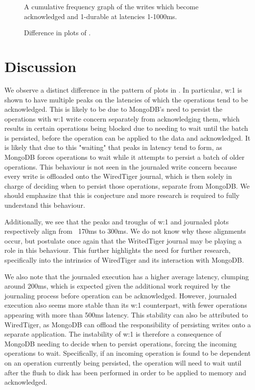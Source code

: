 \begin{figure}
    \centering        
    
    \label{fig:cdf}
    \caption{A cumulative frequency graph of the writes which become acknowledged and 1-durable at latencies 1-1000ms.}
\end{figure}

\begin{figure}
    \centering
    
    \label{fig:diff}
    \caption{Difference in plots of .}
\end{figure}

\section{Discussion}

We observe a distinct difference in the pattern of plots in . In particular, w:1 is shown to have multiple peaks on the latencies of which the operations tend to be acknowledged. This is likely to be due to MongoDB's need to persist the operations with w:1 write concern separately from acknowledging them, which results in certain operations being blocked due to needing to wait until the batch is persisted, before the operation can be applied to the data and acknowledged. It is likely that due to this "waiting" that peaks in latency tend to form, as MongoDB forces operations to wait while it attempts to persist a batch of older operations. This behaviour is not seen in the journaled write concern because every write is offloaded onto the WiredTiger journal, which is then solely in charge of deciding when to persist those operations, separate from MongoDB. We should emphasize that this is conjecture and more research is required to fully understand this behaviour.

Additionally, we see that the peaks and troughs of w:1 and journaled plots respectively align from ~170ms to 300ms. We do not know why these alignments occur, but postulate once again that the WritedTiger journal may be playing a role in this behaviour. This further highlights the need for further research, specifically into the intrinsics of WiredTiger and its interaction with MongoDB.

We also note that the journaled execution has a higher average latency, clumping around 200ms, which is expected given the additional work required by the journaling process before operation can be acknowledged. However, journaled execution also seems more stable than its w:1 counterpart, with fewer operations appearing with more than 500ms latency. This stability can also be attributed to WiredTiger, as MongoDB can offload the responsibility of persisting writes onto a separate application. The instability of w:1 is therefore a consequence of MongoDB needing to decide when to persist operations, forcing the incoming operations to wait. Specifically, if an incoming operation is found to be dependent on an operation currently being persisted, the operation will need to wait until after the flush to disk has been performed in order to be applied to memory and acknowledged.

